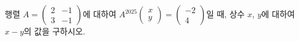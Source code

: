 행렬 $A=\begin{pmatrix} 2 & -1 \\ 3 & -1 \end{pmatrix}$에 대하여 $A^{2025}\begin{pmatrix} x \\ y \end{pmatrix}=\begin{pmatrix} -2 \\ 4 \end{pmatrix}$일 때, 상수 $x$, $y$에 대하여 $x-y$의 값을 구하시오.
